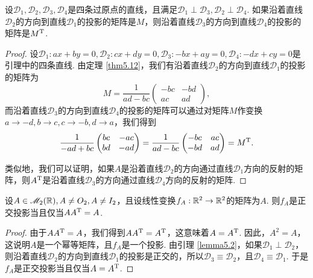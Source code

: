 \begin{mybox}
  \begin{lemma}
    设$\mathscr D_1,\mathscr D_2,\mathscr D_3,\mathscr D_4$是四条过原点的直线，且满足$\mathscr D_1\perp \mathscr D_3,\mathscr D_2\perp\mathscr D_4$. 如果沿着直线$\mathscr D_2$的方向到直线$\mathscr D_1$的投影的矩阵是$M$，则沿着直线$\mathscr D_3$的方向到直线$\mathscr D_4$的投影的矩阵是$M^{\mathrm T}$.
  \end{lemma}
\end{mybox}
\begin{proof}
  设$\mathscr D_1:ax+by=0,\mathscr D_2:cx+dy=0,\mathscr D_3:-bx+ay=0,\mathscr D_4:-dx+cy=0$是引理中的四条直线. 由定理 \ref{thm5.12}，我们有沿着直线$\mathscr D_2$的方向到直线$\mathscr D_1$的投影的矩阵为
  \[
    M = \frac1{ad-bc} \begin{pmatrix}
      -bc & -bd \\
      ac & ad
    \end{pmatrix},
  \]
  而沿着直线$\mathscr D_3$的方向到直线$\mathscr D_4$的投影的矩阵可以通过对矩阵$M$作变换$a\to-d,b\to c,c\to-b,d\to a$，我们得到
  \[
    \frac1{-ad+bc} \begin{pmatrix}
      bc & -ac \\
      bd & -ad
    \end{pmatrix} = \frac1{ad-bc} \begin{pmatrix}
      -bc & ac \\
      -bd & ad
    \end{pmatrix} = M^{\mathrm T}.
  \]
  
  类似地，我们可以证明，如果$A$是沿着直线$\mathscr D_2$的方向通过直线$\mathscr D_1$方向的反射的矩阵，则$A^{\mathrm T}$是沿着直线$\mathscr D_3$的方向通过直线$\mathscr D_4$方向的反射的矩阵.
\end{proof}

\begin{mybox}
  \begin{lemma}[线性映射何时为正交投影?]

    设$A\in\mathscr M_2(\mathbb R),A\ne O_2,A\ne I_2$，且设线性变换$f_A:\mathbb R^2\to\mathbb R^2$的矩阵为$A$. 则$f_A$是正交投影当且仅当$AA^{\mathrm T}=A$.
  \end{lemma}
\end{mybox}
\begin{proof}
  由于$AA^{\mathrm T}=A$，我们得到$AA^{\mathrm T}=A^{\mathrm T}$，这意味着$A=A^{\mathrm T}$. 因此，$A^2=A$，这说明$A$是一个幂等矩阵，且$f_A$是一个投影. 由引理 \ref{lemma5.2}，如果$\mathscr D_1\perp \mathscr D_2$，则沿着直线$\mathscr D_2$的方向到直线$\mathscr D_1$的投影是正交的，所以$\mathscr D_3\equiv \mathscr D_2$，且$\mathscr D_4\equiv\mathscr D_1$. 于是$f_A$是正交投影当且仅当$A=A^{\mathrm T}$.
\end{proof}

